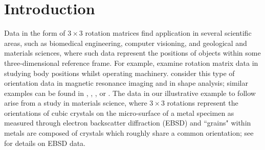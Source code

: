 \section{Introduction}\label{ch:intro}

Data in the form of $3 \times 3$ rotation matrices find application in several scientific areas, 
such as biomedical engineering, computer visioning, and geological and materials sciences, where such data represent the positions of objects within some three-dimensional
reference frame.  For example, \citet{rancourt00} examine rotation matrix data in studying body 
positions whilst operating machinery. \cite{fletcher09} consider this type of  orientation data in 
magnetic resonance imaging and in shape analysis; similar examples  can be found in \cite{schwartz05}, \cite{pierrynowski09},  \cite{dai10},  or \cite{hadani11}.  The data in our illustrative 
example to follow arise from a study in materials science, where $3 \times 3$ rotations represent the orientations of cubic crystals on the micro-surface of a metal specimen as measured through electron backscatter diffraction (EBSD) and ``grains" within metals are composed of crystals which roughly share a common orientation; see \cite{randle03} for details on EBSD data.  
     
